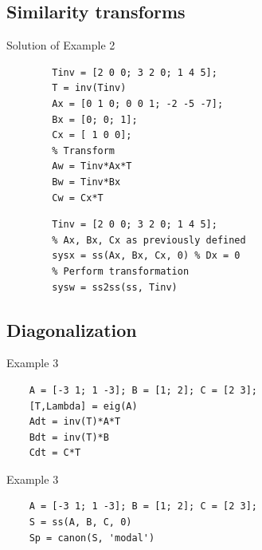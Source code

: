\subsection*{Similarity transforms}

\begin{slide}
	Solution of Example 2
	\begin{verbatim}
		Tinv = [2 0 0; 3 2 0; 1 4 5];
		T = inv(Tinv)
		Ax = [0 1 0; 0 0 1; -2 -5 -7];
		Bx = [0; 0; 1];
		Cx = [ 1 0 0];
		% Transform
		Aw = Tinv*Ax*T
		Bw = Tinv*Bx
		Cw = Cx*T
	\end{verbatim}
\end{slide}

\begin{slide}
	\begin{verbatim}
		Tinv = [2 0 0; 3 2 0; 1 4 5];
		% Ax, Bx, Cx as previously defined
		sysx = ss(Ax, Bx, Cx, 0) % Dx = 0
		% Perform transformation
		sysw = ss2ss(ss, Tinv)
	\end{verbatim}
\end{slide}


\subsection*{Diagonalization}

\begin{slide}
Example 3
\begin{verbatim}
	A = [-3 1; 1 -3]; B = [1; 2]; C = [2 3];
	[T,Lambda] = eig(A)
	Adt = inv(T)*A*T
	Bdt = inv(T)*B
	Cdt = C*T
\end{verbatim}
\end{slide}

\begin{slide}
Example 3
\begin{verbatim}
	A = [-3 1; 1 -3]; B = [1; 2]; C = [2 3];
	S = ss(A, B, C, 0)
	Sp = canon(S, 'modal')
\end{verbatim}
\end{slide}




\endinput

